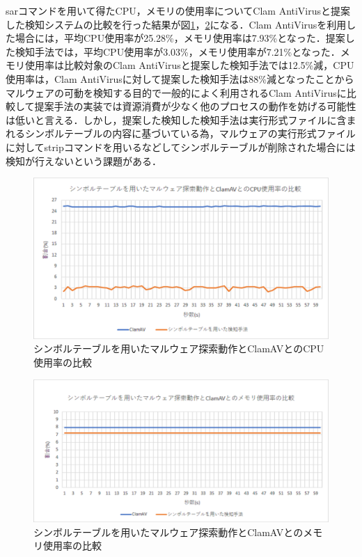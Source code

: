 sarコマンドを用いて得たCPU，メモリの使用率についてClam AntiVirusと提案した検知システムの比較を行った結果が図\ref{fig:symbol_cpu}，\ref{fig:symbol_mem}になる．Clam AntiVirusを利用した場合には，平均CPU使用率が25.28\%，メモリ使用率は7.93\%となった．提案した検知手法では，平均CPU使用率が3.03\%，メモリ使用率が7.21\%となった．メモリ使用率は比較対象のClam AntiVirusと提案した検知手法では12.5\%減，CPU使用率は，Clam AntiVirusに対して提案した検知手法は88\%減となったことからマルウェアの可動を検知する目的で一般的によく利用されるClam AntiVirusに比較して提案手法の実装では資源消費が少なく他のプロセスの動作を妨げる可能性は低いと言える．しかし，提案した検知した検知手法は実行形式ファイルに含まれるシンボルテーブルの内容に基づいている為，マルウェアの実行形式ファイルに対してstripコマンドを用いるなどしてシンボルテーブルが削除された場合には検知が行えないという課題がある．

\begin{figure}[h]
 \centering
    \includegraphics[width=120mm]{figures/cpu.eps}
 \caption{シンボルテーブルを用いたマルウェア探索動作とClamAVとのCPU使用率の比較}
 \label{fig:symbol_cpu}
 \end{figure}
 
 
\begin{figure}[h]
 \centering
    \includegraphics[width=120mm]{figures/mem.eps}
   \caption{シンボルテーブルを用いたマルウェア探索動作とClamAVとのメモリ使用率の比較}
    \label{fig:symbol_mem}
 \end{figure}
